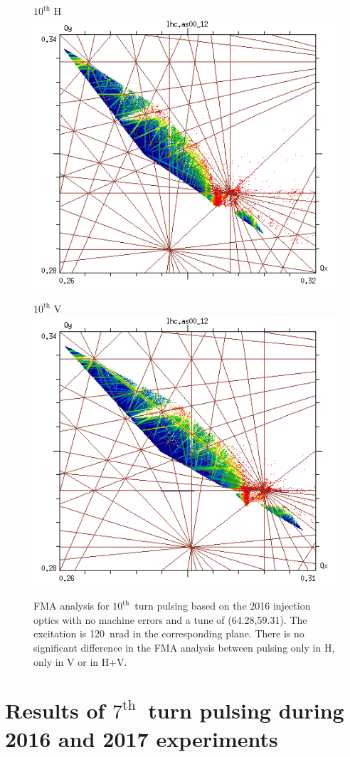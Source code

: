 \documentclass[%
 reprint,
 amsmath,amssymb,
 aps,
prstab,
]{revtex4-1}
\begin{document}
\begin{figure}[h]
\begin{minipage}[t]{0.49\linewidth}
	\end{minipage}	
	\begin{minipage}[t]{0.49\linewidth}
		\centering
		$10^{\mathrm{th}}$ H
		\includegraphics[width=1.0\linewidth]{2016injnocolc15o+19_6noerrut10skh_dp0_ord10.png}
	\end{minipage}	
	\begin{minipage}[t]{0.49\linewidth}
		\centering
		$10^{\mathrm{th}}$ V
		\includegraphics[width=1.0\linewidth]{2016injnocolc15o+19_6noerrut10skv_dp0_ord10.png}
	\end{minipage}
	\caption{\label{fig:fma:10} FMA analysis for $10^{\mathrm{th}}$~turn pulsing based on the 2016 injection optics with no machine errors and a tune of (64.28,59.31). The excitation is 120~nrad in the corresponding plane. There is no significant difference in the FMA analysis between pulsing only in H, only in V or in H+V.}
\end{figure}

\section{Results of $7^{\mathrm{th}}$~turn pulsing during 2016 and 2017 experiments}

\end{document}
